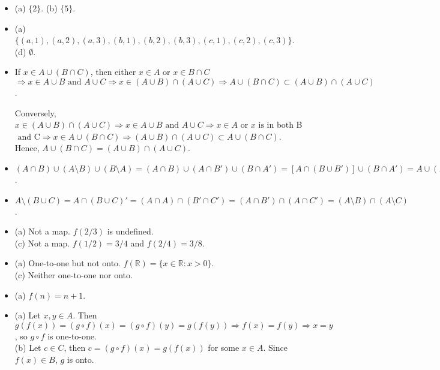  
{\small
\begin{itemize}
 
\item[1.]
(a) $\{ 2 \}$.
(b) $\{ 5 \}$.
 
\item[2.]
(a) $\{ (a,1), (a,2), (a,3), (b,1), (b,2), (b,3), (c,1), (c,2),
(c,3) \}$. \\
(d) $\emptyset$.
 
\item[6.]
If $x \in A \cup (B \cap C)$, then either $x \in A$ or $x \in B \cap 
C$  $\Rightarrow x \in A \cup B \text{ and } A \cup C \Rightarrow x
\in (A \cup B) \cap (A \cup C) \Rightarrow  A \cup (B \cap C) \subset 
(A \cup B) \cap (A \cup C)$. 
 
Conversely, $x \in (A \cup B) \cap (A \cup C) \Rightarrow  x \in A 
\cup B \text{ and } A \cup C \Rightarrow x \in A  \text{ or } x \text{ is in
both } $B$ \text{ and } $C$  \Rightarrow x \in A \cup (B \cap C) \Rightarrow
(A \cup B) \cap (A \cup C) \subset A \cup (B \cap C)$. Hence, $A \cup 
(B \cap C) = (A \cup B) \cap (A \cup C)$. 
 
\item[10.]
$(A \cap B) \cup (A \setminus B) \cup (B \setminus A) = (A \cap B) \cup 
(A \cap B') \cup (B \cap A') = [A \cap (B \cup B')] \cup (B \cap A')
= A \cup (B \cap A') = (A \cup B) \cap (A \cup A') = A \cup B$.
 
 
\item[14.]
$A \setminus (B \cup C) = A \cap (B \cup C)'
= (A \cap A) \cap (B' \cap C')
= (A \cap B') \cap (A \cap C') = 
(A \setminus B) \cap (A \setminus C)$. 
 
\item[17.]
(a) Not a map. $f(2/3)$ is undefined. \\
(c) Not a map. $f(1/2) =3/4$ and $f(2/4)=3/8$.
 
\item[18.]
(a)  One-to-one but not onto. $f({\mathbb R} ) = \{ x \in {\mathbb R} : x
> 0 \}$. \\
(c) Neither one-to-one nor onto.
 
\item[20.]
(a) $f(n) = n + 1$.
 
\item[22.]
(a) Let $x, y \in A$. Then $g(f(x)) = (g \circ f)(x) = (g \circ
f)(y) = g(f(y)) \Rightarrow f(x) = f(y) \Rightarrow x = y$,  so $g
\circ f$ is one-to-one. \\
(b) Let $c \in C$, then $c = (g \circ f)(x) = g(f(x))$ for some
$x \in A$. Since $f(x) \in B$, $g$ is onto.
 

\end{itemize}}
